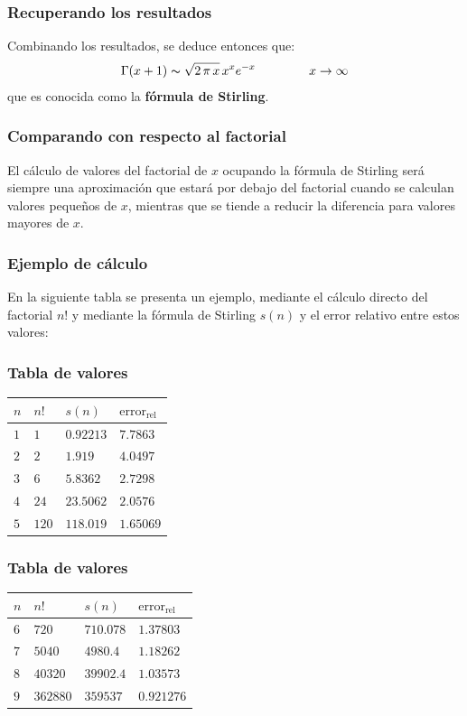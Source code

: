 \documentclass[12pt]{beamer}
\begin{document}
\begin{frame}
\frametitle{Recuperando los resultados}
Combinando los resultados, se deduce entonces que:
\pause
\begin{align*}
\Gamma (x + 1) \thicksim \sqrt{2 \, \pi \, x} \, x^{x} e^{-x} \hspace{1.5cm} x \to \infty
\end{align*}
que es conocida como la \textbf{fórmula de Stirling}.
\end{frame}
\begin{frame}
\frametitle{Comparando con respecto al factorial}
El cálculo de valores del factorial de $x$ ocupando la fórmula de Stirling será siempre una aproximación que estará por debajo del factorial cuando se calculan valores pequeños de $x$, \pause mientras que se tiende a reducir la diferencia para valores mayores de $x$.
\end{frame}
\begin{frame}
\frametitle{Ejemplo de cálculo}
En la siguiente tabla se presenta un ejemplo, mediante el cálculo directo del factorial $n!$ y mediante la fórmula de Stirling $s(n)$ y el error relativo entre estos valores:
\end{frame}
\begin{frame}
\frametitle{Tabla de valores}
\begin{table}[H]
\centering
\begin{tabular}{l l l l}
$n$ & $n!$ & $s(n)$ & $\mbox{error}_{\mbox{rel}}$ \\ \hline
$1$ & $1$ & $0.92213$ & $7.7863$ \\ \hline \pause
$2$ & $2$ & $1.919$ & $4.0497$ \\ \hline \pause
$3$ & $6$ & $5.8362$ & $2.7298$ \\ \hline \pause
$4$ & $24$ & $23.5062$ & $2.0576$ \\ \hline
$5$ & $120$ & $118.019$ & $1.65069$
\end{tabular}
\end{table}
\end{frame}
\begin{frame}
\frametitle{Tabla de valores}
\begin{table}[H]
\centering
\begin{tabular}{l l l l}
$n$ & $n!$ & $s(n)$ & $\mbox{error}_{\mbox{rel}}$ \\ \hline
$6$ & $720$ & $710.078$ & $1.37803$ \\ \hline \pause
$7$ & $5040$ & $4980.4$ & $1.18262$ \\ \hline \pause
$8$ & $40320$ & $39902.4$ & $1.03573$ \\ \hline \pause
$9$ & $362880$ & $359537$ & $0.921276$ \\ \hline
\end{tabular}
\end{table}
\end{frame}
\end{document}
